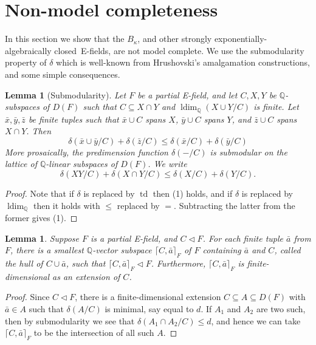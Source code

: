 \documentclass[12pt]{amsart}
\newtheorem{lemma}[prop]{Lemma}
\theoremstyle{definition}
\begin{document}
\section{Non-model completeness}
In this section we show that the $B_\kappa$, and other {strongly exponentially-algebraically closed}\ E-fields, are not model complete. We use the submodularity property of $\delta$ which is well-known from Hrushovski's amalgamation constructions, and some simple consequences.

\begin{lemma}[Submodularity] 
Let $F$ be a partial E-field, and let $C,X,Y$ be {\ensuremath{\mathbb{Q}}}-subspaces of $D(F)$ such that $C {\subseteq} X \cap Y$ and $\operatorname{ldim}_{\ensuremath{\mathbb{Q}}}(X\cup Y/C)$ is finite. Let ${{\ensuremath{\bar{x}}}},{{\ensuremath{\bar{y}}}},{{\ensuremath{\bar{z}}}}$ be finite tuples such that ${{\ensuremath{\bar{x}}}} \cup C$ spans $X$, ${{\ensuremath{\bar{y}}}} \cup C$ spans $Y$, and ${{\ensuremath{\bar{z}}}} \cup C$ spans $X \cap Y$. Then
\begin{equation}
\delta({{\ensuremath{\bar{x}}}} \cup{{\ensuremath{\bar{y}}}}/C) + \delta({{\ensuremath{\bar{z}}}}/C) {\ensuremath{\leqslant}} \delta({{\ensuremath{\bar{x}}}}/C) + \delta({{\ensuremath{\bar{y}}}}/C) 
\end{equation}
More prosaically, the predimension function $\delta(-/C)$ is submodular on the lattice of ${\ensuremath{\mathbb{Q}}}$-linear subspaces of $D(F)$.
We write 
\[\delta(XY/C) + \delta(X \cap Y/C) {\ensuremath{\leqslant}} \delta(X/C) + \delta(Y/C).\]
\end{lemma}
\begin{proof}
Note that if $\delta$ is replaced by $\operatorname{td}$ then (1) holds, and if $\delta$ is replaced by $\operatorname{ldim}_{\ensuremath{\mathbb{Q}}}$ then it holds with ${\ensuremath{\leqslant}}$ replaced by $=$. Subtracting the latter from the former gives (1).
\end{proof}

\begin{lemma}\label{hull lemma}
  Suppose $F$ is a partial E-field, and $C {\ensuremath{\lhd}} F$. For each finite tuple ${{\ensuremath{\bar{a}}}}$ from $F$, there is a smallest ${\ensuremath{\mathbb{Q}}}$-vector subspace ${\ensuremath{\lceil {C,{{\ensuremath{\bar{a}}}}}\rceil}}_F$ of $F$ containing ${{\ensuremath{\bar{a}}}}$ and $C$, called the \emph{hull} of $C \cup{{\ensuremath{\bar{a}}}}$, such that ${\ensuremath{\lceil {C,{{\ensuremath{\bar{a}}}}}\rceil}}_F {\ensuremath{\lhd}} F$. Furthermore, ${\ensuremath{\lceil {C,{{\ensuremath{\bar{a}}}}}\rceil}}_F$ is finite-dimensional as an extension of $C$.
\end{lemma}
\begin{proof}
  Since $C {\ensuremath{\lhd}} F$, there is a finite-dimensional extension $C {\subseteq} A {\subseteq} D(F)$ with ${{\ensuremath{\bar{a}}}} \in A$ such that $\delta(A/C)$ is minimal, say equal to $d$. If $A_1$ and $A_2$ are two such, then by submodularity we see that $\delta(A_1\cap A_2/C) {\ensuremath{\leqslant}} d$, and hence we can take ${\ensuremath{\lceil {C,{{\ensuremath{\bar{a}}}}}\rceil}}_F$ to be the intersection of all such $A$.
\end{proof}
\end{document}
